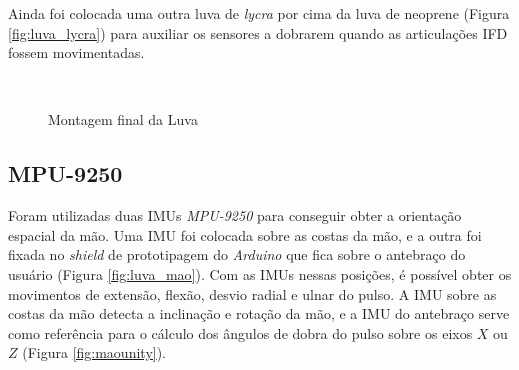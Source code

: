 Ainda foi colocada uma outra luva de \textit{lycra} por cima da luva de neoprene (Figura \ref{fig:luva_lycra}) para auxiliar os sensores a dobrarem quando as articulações \ac{IFD} fossem movimentadas.

\begin{figure}[H]
  \setlength{\abovecaptionskip}{0pt}
  \setlength{\belowcaptionskip}{0pt}
  \caption[Montagem final da Luva]{Montagem final da Luva}
  \centering
  \qquad
  \\
  \captionsetup{justification=centering}
  \label{fig:sensores_luva}
\end{figure}


\subsection{MPU-9250} %
\label{sub:mpu_9250}
Foram utilizadas duas \ac{IMU}s \textit{MPU-9250} para conseguir obter a orientação espacial da mão. Uma \ac{IMU} foi colocada sobre as costas da mão, e a outra foi fixada no \textit{shield} de prototipagem do \textit{Arduino} que fica sobre o antebraço do usuário (Figura \ref{fig:luva_mao}). Com as \ac{IMU}s nessas posições, é possível obter os movimentos de extensão, flexão, desvio radial e ulnar do pulso. A \ac{IMU} sobre as costas da mão detecta a inclinação e rotação da mão, e a \ac{IMU} do antebraço serve como referência para o cálculo dos ângulos de dobra do pulso sobre os eixos $X$ ou $Z$ (Figura \ref{fig:maounity}).

